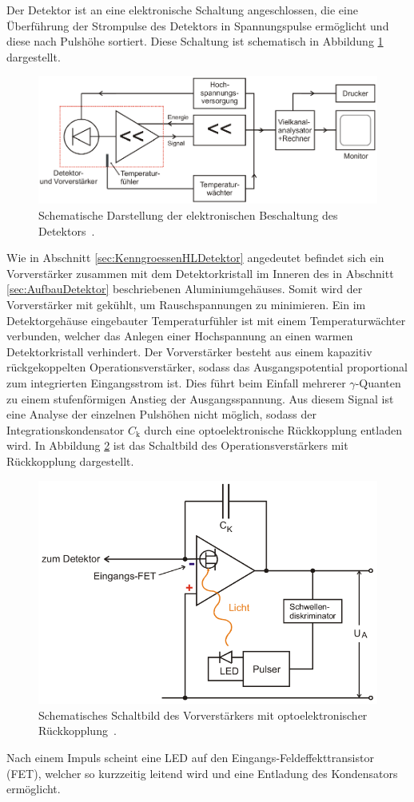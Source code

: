 Der Detektor ist an eine elektronische Schaltung angeschlossen, die eine Überführung
der Strompulse des Detektors in Spannungspulse ermöglicht und diese nach Pulshöhe sortiert.
Diese Schaltung ist schematisch in Abbildung \ref{fig:Gesamtschaltbild} dargestellt.
\begin{figure}
	\centering
	\includegraphics[width=.9\textwidth]{images/Gesamtschaltbild.pdf}
	\caption{Schematische Darstellung der elektronischen Beschaltung des Detektors~\cite[22]{anleitung}.}
	\label{fig:Gesamtschaltbild}
\end{figure}
Wie in Abschnitt \ref{sec:KenngroessenHLDetektor} angedeutet befindet sich ein Vorverstärker
zusammen mit dem Detektorkristall im Inneren des in Abschnitt \ref{sec:AufbauDetektor}
beschriebenen Aluminiumgehäuses.
Somit wird der Vorverstärker mit gekühlt, um Rauschspannungen zu minimieren.
Ein im Detektorgehäuse eingebauter Temperaturfühler ist mit einem Temperaturwächter verbunden,
welcher das Anlegen einer Hochspannung an einen warmen Detektorkristall verhindert.
Der Vorverstärker besteht aus einem kapazitiv rückgekoppelten Operationsverstärker, sodass
das Ausgangspotential proportional zum integrierten Eingangsstrom ist.
Dies führt beim Einfall mehrerer $\gamma$-Quanten zu einem stufenförmigen Anstieg der Ausgangsspannung.
Aus diesem Signal ist eine Analyse der einzelnen Pulshöhen nicht möglich,
sodass der Integrationskondensator $C_\text{k}$ durch eine optoelektronische Rückkopplung
entladen wird. In Abbildung \ref{fig:Optoelektronische-Rueckkopplung} ist das Schaltbild
des Operationsverstärkers mit Rückkopplung dargestellt.
\begin{figure}
	\centering
	\includegraphics[width=.7\textwidth]{images/Optoelektronische-Rueckkopplung.pdf}
	\caption{Schematisches Schaltbild des Vorverstärkers mit optoelektronischer Rückkopplung~\cite[19]{anleitung}.}
	\label{fig:Optoelektronische-Rueckkopplung}
\end{figure}
Nach einem Impuls scheint eine LED auf den Eingangs-Feldeffekttransistor (FET), welcher so kurzzeitig
leitend wird und eine Entladung des Kondensators ermöglicht.


